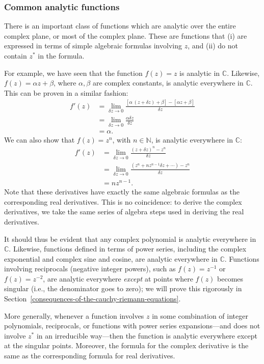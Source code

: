 \documentclass[10pt,a4paper]{article}
\begin{document}
\subsubsection{Common analytic functions}
\label{common-analytic-functions}

There is an important class of functions which are analytic over the
entire complex plane, or most of the complex plane.  These are
functions that (i) are expressed in terms of simple algebraic formulas
involving $z$, and (ii) do not contain $z^*$ in the formula.

For example, we have seen that the function $f(z) = z$ is analytic in
$\mathbb{C}$.  Likewise, $f(z) = \alpha z + \beta$, where $\alpha,
\beta$ are complex constants, is analytic everywhere in
$\mathbb{C}$. This can be proven in a similar fashion:
\begin{align}
  f'(z) &= \lim_{\delta z\rightarrow 0} \frac{[\alpha\,(z+\delta z) + \beta] - [\alpha z + \beta]}{\delta z} \\
  &= \lim_{\delta z\rightarrow 0} \frac{\alpha \delta z}{\delta z} \\
  &= \alpha.
\end{align}
We can also show that $f(z) = z^n$, with $n \in \mathbb{N}$, is
analytic everywhere in $\mathbb{C}$:
\begin{align}
  f'(z) &= \lim_{\delta z\rightarrow 0} \frac{(z+\delta z)^n - z^n}{\delta z} \\
  &= \lim_{\delta z\rightarrow 0} \frac{(z^n + n z^{n-1} \delta z + \cdots) - z^n}{\delta z} \\
  &= n z^{n-1}.
\end{align}
Note that these derivatives have exactly the same algebraic formulas
as the corresponding real derivatives. This is no coincidence: to
derive the complex derivatives, we take the same series of algebra
steps used in deriving the real derivatives.

It should thus be evident that any complex polynomial is analytic
everywhere in $\mathbb{C}$. Likewise, functions defined in terms of
power series, including the complex exponential and complex sine and
cosine, are analytic everywhere in $\mathbb{C}$. Functions involving
reciprocals (negative integer powers), such as $f(z) = z^{-1}$ or
$f(z) = z^{-2}$, are analytic everywhere \textit{except} at points
where $f(z)$ becomes singular (i.e., the denominator goes to zero); we
will prove this rigorously in
Section~\ref{consequences-of-the-cauchy-riemann-equations}.

More generally, whenever a function involves $z$ in some combination
of integer polynomials, reciprocals, or functions with power series
expansions---and does not involve $z^*$ in an irreducible way---then
the function is analytic everywhere except at the singular points.
Moreover, the formula for the complex derivative is the same as the
corresponding formula for real derivatives.
\end{document}
